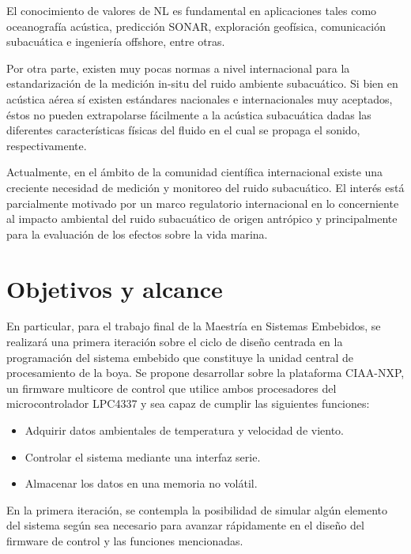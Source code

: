 
El conocimiento de valores de NL es fundamental en aplicaciones tales como oceanografía acústica, predicción SONAR, exploración geofísica, comunicación subacuática e ingeniería offshore, entre otras.

Por otra parte, existen muy pocas normas a nivel internacional para la estandarización de la medición in-situ del ruido ambiente subacuático. Si bien en acústica aérea sí existen estándares nacionales e internacionales muy aceptados, éstos no pueden extrapolarse fácilmente a la acústica subacuática dadas las diferentes características físicas del fluido en el cual se propaga el sonido, respectivamente.

Actualmente, en el ámbito de la comunidad científica internacional existe una creciente necesidad de medición y monitoreo del ruido subacuático. El interés está parcialmente motivado por un marco regulatorio internacional en lo concerniente al impacto ambiental del ruido subacuático de origen antrópico y principalmente para la evaluación de los efectos sobre la vida marina.



\section{Objetivos y alcance}


En particular, para el trabajo final de la Maestría en Sistemas Embebidos, se realizará una primera iteración sobre el ciclo de diseño centrada en la programación del sistema embebido que constituye la unidad central de procesamiento de la boya.  Se propone desarrollar sobre la plataforma CIAA-NXP, un firmware multicore de control que utilice ambos procesadores del microcontrolador LPC4337 y sea capaz de cumplir las siguientes funciones:

\begin{itemize}
	\item Adquirir datos ambientales de temperatura y velocidad de viento.
	\item Controlar el sistema mediante una interfaz serie.
	\item Almacenar los datos en una memoria no volátil.
\end{itemize}

En la primera iteración, se contempla la posibilidad de simular algún elemento del sistema según sea necesario para avanzar rápidamente en el diseño del firmware de control y las funciones mencionadas. 

